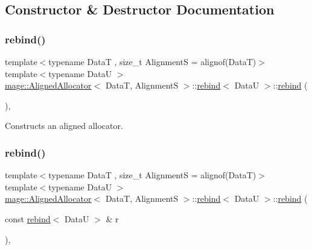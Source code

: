 \subsection{Constructor \& Destructor Documentation}
\hypertarget{structmage_1_1_aligned_allocator_1_1rebind_a2b26e5afbed6b26f73ed0186c2ff52d6}{}\label{structmage_1_1_aligned_allocator_1_1rebind_a2b26e5afbed6b26f73ed0186c2ff52d6} 
\subsubsection{\texorpdfstring{rebind()}{rebind()}\hspace{0.1cm}{\footnotesize\ttfamily [1/3]}}
{\footnotesize\ttfamily template$<$typename DataT , size\+\_\+t AlignmentS = alignof(\+Data\+T)$>$ \\
template$<$typename DataU $>$ \\
\hyperlink{classmage_1_1_aligned_allocator}{mage\+::\+Aligned\+Allocator}$<$ DataT, AlignmentS $>$\+::\hyperlink{structmage_1_1_aligned_allocator_1_1rebind}{rebind}$<$ DataU $>$\+::\hyperlink{structmage_1_1_aligned_allocator_1_1rebind}{rebind} (\begin{DoxyParamCaption}{ }\end{DoxyParamCaption})\hspace{0.3cm}{\ttfamily [private]}, {\ttfamily [delete]}}

Constructs an aligned allocator. \hypertarget{structmage_1_1_aligned_allocator_1_1rebind_a3ec1fb665819e0061c26e2366861f64a}{}\label{structmage_1_1_aligned_allocator_1_1rebind_a3ec1fb665819e0061c26e2366861f64a} 
\subsubsection{\texorpdfstring{rebind()}{rebind()}\hspace{0.1cm}{\footnotesize\ttfamily [2/3]}}
{\footnotesize\ttfamily template$<$typename DataT , size\+\_\+t AlignmentS = alignof(\+Data\+T)$>$ \\
template$<$typename DataU $>$ \\
\hyperlink{classmage_1_1_aligned_allocator}{mage\+::\+Aligned\+Allocator}$<$ DataT, AlignmentS $>$\+::\hyperlink{structmage_1_1_aligned_allocator_1_1rebind}{rebind}$<$ DataU $>$\+::\hyperlink{structmage_1_1_aligned_allocator_1_1rebind}{rebind} (\begin{DoxyParamCaption}\item[{const \hyperlink{structmage_1_1_aligned_allocator_1_1rebind}{rebind}$<$ DataU $>$ \&}]{r }\end{DoxyParamCaption})\hspace{0.3cm}{\ttfamily [private]}, {\ttfamily [delete]}}

